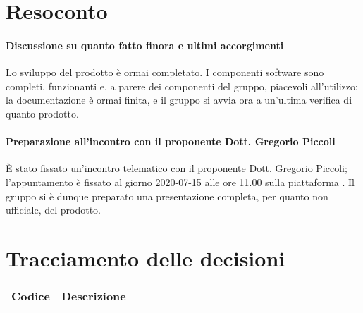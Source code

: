 \documentclass{article}
\begin{document}
\section{Resoconto}%
\label{resoconto}
\paragraph*{Discussione su quanto fatto finora e ultimi accorgimenti}
Lo sviluppo del prodotto è ormai completato. I componenti software sono completi, funzionanti e, a parere dei componenti del gruppo, piacevoli all'utilizzo; 
la documentazione è ormai finita, e il gruppo si avvia ora a un'ultima verifica di quanto prodotto.

\paragraph*{Preparazione all'incontro con il proponente Dott. Gregorio Piccoli}
È stato fissato un'incontro telematico con il proponente Dott. Gregorio Piccoli; l'appuntamento è fissato al giorno 2020-07-15 alle ore 11.00 sulla piattaforma .
Il gruppo si è dunque preparato una presentazione completa, per quanto non ufficiale, del prodotto.

\section{Tracciamento delle decisioni}
\begin{table}[H]
  \centering
  \begin{tabular}{p{4cm}|p{12cm}}
    \rowcolor{lightgray}
    \textbf{Codice}  & \textbf{Descrizione}      \\
  \end{tabular}
\end{table}
\end{document}
